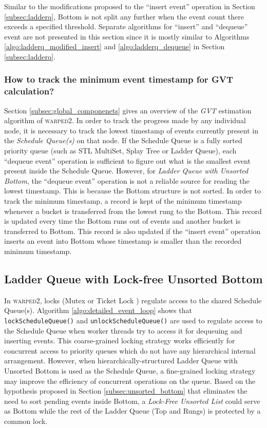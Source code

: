 \documentclass[11pt]{book}
\begin{document}
Similar to the modifications proposed to the ``insert event'' operation in Section \ref{subsec:ladderq},
Bottom is not split any further when the event count there exceeds a specified threshold.  Separate algorithms
for ``insert'' and ``dequeue'' event are not presented in this section since it is mostly similar to
Algorithms \ref{algo:ladderq_modified_insert} and \ref{algo:ladderq_dequeue} in Section \ref{subsec:ladderq}.

\subsubsection{How to track the minimum event timestamp for GVT calculation?}\label{subsubsec:min_ts_for_gvt}

Section \ref{subsec:global_componenets} gives an overview of the \emph{GVT} estimation algorithm of
\textsc{warped2}.  In order to track the progress made by any individual node, it is necessary to track the
lowest timestamp of events currently present in the \emph{Schedule Queue(s)} on that node.  If the Schedule
Queue is a fully sorted priority queue (such as STL MultiSet, Splay Tree or Ladder Queue), each ``dequeue
event'' operation is sufficient to figure out what is the smallest event present inside the Schedule Queue.
However, for \emph{Ladder Queue with Unsorted Bottom}, the ``dequeue event'' operation is not a reliable
source for reading the lowest timestamp.  This is because the Bottom structure is not sorted.  In order to
track the minimum timestamp, a record is kept of the minimum timestamp whenever a bucket is transferred from
the lowest rung to the Bottom.  This record is updated every time the Bottom runs out of events and another
bucket is transferred to Bottom.  This record is also updated if the ``insert event'' operation inserts an
event into Bottom whose timestamp is smaller than the recorded minimum timestamp.

\subsection{Ladder Queue with Lock-free Unsorted Bottom}\label{subsec:lockfree}

In \textsc{warped2}, locks (Mutex \cite{dijkstra-65} or Ticket Lock \cite{mellor-91}) regulate access to the
shared Schedule Queue(s).  Algorithm \ref{algo:detailed_event_loop} shows that \texttt{lockScheduleQueue()}
and \texttt{unlockScheduleQueue()} are used to regulate access to the Schedule Queue when worker threads try
to access it for dequeuing and inserting events.  This coarse-grained locking strategy works efficiently for
concurrent access to priority queues which do not have any hierarchical internal arrangement.  However, when
hierarchically-structured Ladder Queue with Unsorted Bottom is used as the Schedule Queue, a fine-grained
locking strategy may improve the efficiency of concurrent operations on the queue.  Based on the hypothesis
proposed in Section \ref{subsec:unsorted_bottom} that eliminates the need to sort pending events inside
Bottom, a \emph{Lock-Free Unsorted List} \cite{fomitchev-04,valois-95,harris-01, zhang-13} could serve as
Bottom while the rest of the Ladder Queue (Top and Rungs) is protected by a common lock.
\end{document}
